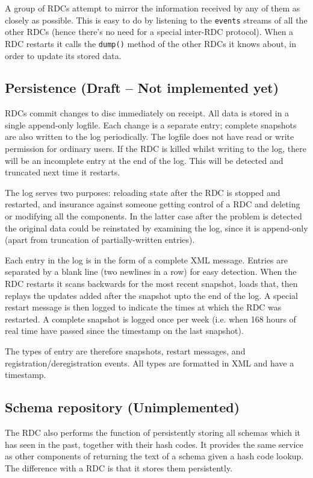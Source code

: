 \documentclass[12pt,a4paper,twoside]{article}
\renewcommand{\_}{\texttt{\symbol{95}}}
\begin{document}
A group of RDCs attempt to mirror the information received by any of
them as closely as possible. This is easy to do by listening to the
\verb^events^ streams of all the
other RDCs (hence there's no need for a special inter-RDC protocol).
When a RDC restarts it calls the \verb^dump()^ method of the
other RDCs it knows about, in order to update its stored data.

\subsection{Persistence (Draft -- Not implemented yet)}

RDCs commit changes to disc immediately on receipt. All data is stored
in a single append-only logfile. Each change is a separate entry;
complete snapshots are also written to the log periodically. The
logfile does not have read or write permission for ordinary users. If
the RDC is killed whilst writing to the log, there will be an
incomplete entry at the end of the log. This will be detected and
truncated next time it restarts.

The log serves two purposes: reloading state after the RDC is stopped
and restarted, and insurance against someone getting control of a RDC
and deleting or modifying all the components. In the latter case after
the problem is detected the original data could be reinstated by
examining the log, since it is append-only (apart from truncation of
partially-written entries).

Each entry in the log is in the form of a complete XML message.
Entries are separated by a blank line (two newlines in a row)
for easy detection. When the RDC restarts it scans backwards for
the most recent snapshot, loads that, then replays the updates
added after the snapshot upto the end of the log. A special
restart message is then logged to indicate the times at which
the RDC was restarted. A complete snapshot is logged once per week
(i.e. when 168 hours of real time have passed since the timestamp
on the last snapshot).

The types of entry are therefore snapshots, restart messages,
and registration/deregistration events. All types are formatted
in XML and have a timestamp.

\subsection{Schema repository (Unimplemented)}

The RDC also performs the function of persistently storing all
schemas which it has seen in the past, together with their
hash codes. It provides the same service as other components
of returning the text of a schema given a hash code lookup.
The difference with a RDC is that it stores them persistently.
\end{document}
